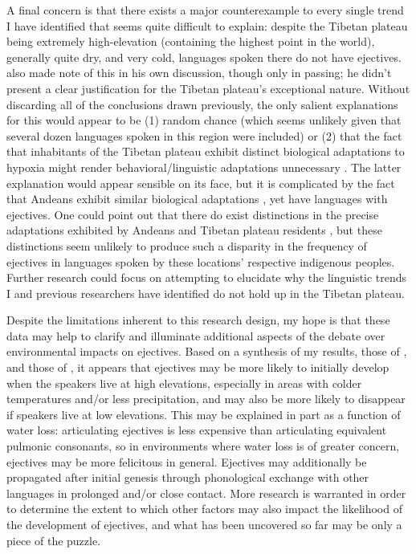 \documentclass{article}
\begin{document}
A final concern is that there exists a major counterexample to every single trend I have identified that seems quite difficult to explain: despite the Tibetan plateau being extremely high-elevation (containing the highest point in the world), generally quite dry, and very cold, languages spoken there do not have ejectives. \textcite{everett2013} also made note of this in his own discussion, though only in passing; he didn't present a clear justification for the Tibetan plateau's exceptional nature. Without discarding all of the conclusions drawn previously, the only salient explanations for this would appear to be (1) random chance (which seems unlikely given that several dozen languages spoken in this region were included) or (2) that the fact that inhabitants of the Tibetan plateau exhibit distinct biological adaptations to hypoxia might render behavioral/linguistic adaptations unnecessary \parencite{beall2000,petousi2014}. The latter explanation would appear sensible on its face, but it is complicated by the fact that Andeans exhibit similar biological adaptations \parencite{beall2000}, yet have languages with ejectives. One could point out that there do exist distinctions in the precise adaptations exhibited by Andeans and Tibetan plateau residents \parencite{beall2002}, but these distinctions seem unlikely to produce such a disparity in the frequency of ejectives in languages spoken by these locations' respective indigenous peoples. Further research could focus on attempting to elucidate why the linguistic trends I and previous researchers have identified do not hold up in the Tibetan plateau.

Despite the limitations inherent to this research design, my hope is that these data may help to clarify and illuminate additional aspects of the debate over environmental impacts on ejectives. Based on a synthesis of my results, those of \textcite{everett2013}, and those of \textcite{urban2021}, it appears that ejectives may be more likely to initially develop when the speakers live at high elevations, especially in areas with colder temperatures and/or less precipitation, and may also be more likely to disappear if speakers live at low elevations. This may be explained in part as a function of water loss: articulating ejectives is less expensive than articulating equivalent pulmonic consonants, so in environments where water loss is of greater concern, ejectives may be more felicitous in general. Ejectives may additionally be propagated after initial genesis through phonological exchange with other languages in prolonged and/or close contact. More research is warranted in order to determine the extent to which other factors may also impact the likelihood of the development of ejectives, and what has been uncovered so far may be only a piece of the puzzle.
\end{document}
